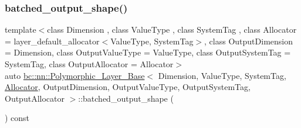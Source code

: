 \mbox{\label{structbc_1_1nn_1_1Polymorphic__Layer__Base_a93154c06cdfce8282d48a114055d3e2a}} 
\subsubsection{\texorpdfstring{batched\+\_\+output\+\_\+shape()}{batched\_output\_shape()}\hspace{0.1cm}{\footnotesize\ttfamily [2/2]}}
{\footnotesize\ttfamily template$<$class Dimension , class Value\+Type , class System\+Tag , class Allocator  = layer\+\_\+default\+\_\+allocator$<$\+Value\+Type, System\+Tag$>$, class Output\+Dimension  = Dimension, class Output\+Value\+Type  = Value\+Type, class Output\+System\+Tag  = System\+Tag, class Output\+Allocator  = Allocator$>$ \\
auto \hyperlink{structbc_1_1nn_1_1Polymorphic__Layer__Base}{bc\+::nn\+::\+Polymorphic\+\_\+\+Layer\+\_\+\+Base}$<$ Dimension, Value\+Type, System\+Tag, \hyperlink{classbc_1_1allocators_1_1Allocator}{Allocator}, Output\+Dimension, Output\+Value\+Type, Output\+System\+Tag, Output\+Allocator $>$\+::batched\+\_\+output\+\_\+shape (\begin{DoxyParamCaption}{ }\end{DoxyParamCaption}) const\hspace{0.3cm}{\ttfamily [inline]}}

\mbox{\label{structbc_1_1nn_1_1Polymorphic__Layer__Base_a317faf7f621b09947ac22385d26e61e4}} 

